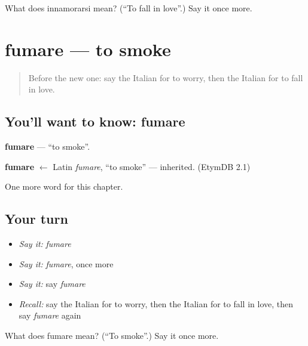 \begin{tcolorbox}[breakable,colback=teal!4,colframe=teal!35!black,title={Before you move on}]
What does innamorarsi mean? (\textquotedblleft{}To fall in love\textquotedblright{}.) Say it once more.
\end{tcolorbox}
\section[fumare]{fumare — to smoke}

\label{lesson:IT-C144-fumare}



\begin{quote}
Before the new one: say the Italian for to worry, then the Italian for to fall in love.
\end{quote}

\subsection*{You'll want to know: fumare}
\textbf{fumare} — \textquotedblleft{}to smoke\textquotedblright{}.

\begin{cousinweb}
\textbf{fumare} $\leftarrow$ Latin \emph{fumare}, \textquotedblleft{}to smoke\textquotedblright{} — inherited. (EtymDB 2.1)
\end{cousinweb}

\begin{grammarlens}[title={What you've built}]
One more word for this chapter.
\end{grammarlens}

\subsection*{Your turn}
\begin{itemize}
\raggedright
  \item \emph{Say it:} \emph{fumare}
  \item \emph{Say it:} \emph{fumare}, once more
  \item \emph{Say it:} say \emph{fumare}
  \item \emph{Recall:} say the Italian for to worry, then the Italian for to fall in love, then say \emph{fumare} again
\end{itemize}

\begin{tcolorbox}[breakable,colback=teal!4,colframe=teal!35!black,title={Before you move on}]
What does fumare mean? (\textquotedblleft{}To smoke\textquotedblright{}.) Say it once more.
\end{tcolorbox}
